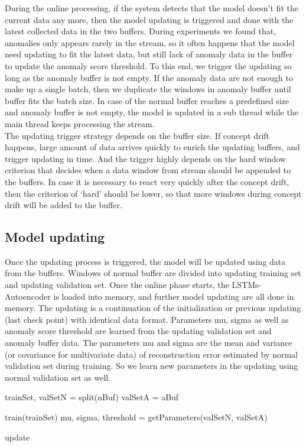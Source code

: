 During the online processing, if the system detects that the model doesn’t fit the current data any more, then the model updating is triggered and done with the latest collected data in the two buffers. During experiments we found that, anomalies only appears rarely in the stream, so it often happens that the model need updating to fit the latest data, but still lack of anomaly data in the buffer to update the anomaly score threshold. To this end, we trigger the updating so long as the anomaly buffer is not empty. If the anomaly data are not enough to make up a single batch, then we duplicate the windows in anomaly buffer until buffer fits the batch size. In case of the normal buffer reaches a predefined size and anomaly buffer is not empty, the model is updated in a sub thread while the main thread keeps processing the stream.\\
 
The updating trigger strategy depends on the buffer size.  If concept drift happens, large amount of data arrives quickly to enrich the updating buffers, and trigger updating in time. And the trigger highly depends on the hard window criterion that decides when a data window from stream should be appended to the buffers. In case it is necessary to react very quickly after the concept drift, then the criterion of ‘hard’ should be lower, so that more windows during concept drift will be added to the buffer.\\


\subsection{Model updating}
\label{updating}

Once the updating process is triggered, the model will be updated using data from the buffers. Windows of normal buffer are divided into updating training set and updating validation set. Once the online phase starts, the LSTMs-Autoencoder is loaded into memory, and further model updating are all done in memory. The updating is a continuation of the initialization or previous updating (last check point) with identical data format. Parameters mu, sigma as well as anomaly score threshold are learned from the updating validation set and anomaly buffer data. The parameters mu and sigma are the mean and variance (or covariance for multivariate data) of reconstruction error estimated by normal validation set during training. So we learn new parameters in the updating using normal validation set as well.

\begin{algorithm}[h]

\BlankLine 
trainSet, valSetN = split(nBuf)\;
valSetA = aBuf\;

train(trainSet)\;    
mu, sigma, threshold = getParameters(valSetN, valSetA)\;

\caption{update}
\label{alg:update}
\end{algorithm}




